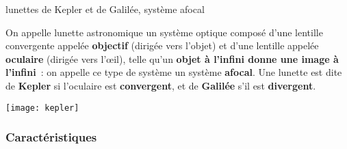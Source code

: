 \documentclass[../main/main.tex]{subfiles}
\begin{document}
\begin{defi}[label=lunettekepler, sidebyside, righthand width=.6\linewidth]{{
            lunettes de Kepler et de Galilée, système afocal}}

    On appelle lunette astronomique un système optique composé d'une lentille
    convergente appelée \textbf{objectif} (dirigée vers l'objet) et d'une
    lentille appelée \textbf{oculaire} (dirigée vers l'œil), telle qu'un
    \textbf{objet à l'infini donne une image à l'infini}~: on appelle ce type de
    système un système \textbf{afocal}. Une lunette est dite de \textbf{Kepler}
    si l'oculaire est \textbf{convergent}, et de \textbf{Galilée} s'il est
    \textbf{divergent}.

    \tcblower
    \begin{center}
        \texttt{[image: kepler]}
        \label{fig:kepler}
    \end{center}
\end{defi}

\subsubsection{Caractéristiques}
\end{document}
